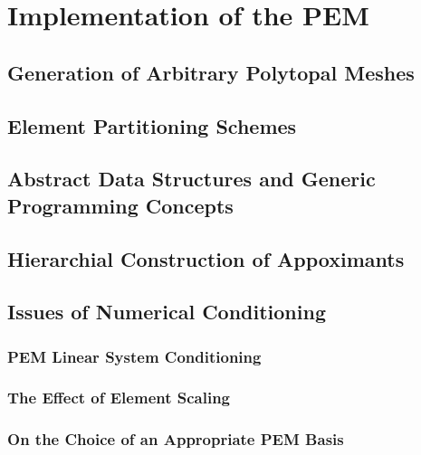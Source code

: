 \chapter{Implementation of the PEM}
%
\section{Generation of Arbitrary Polytopal Meshes}

\section{Element Partitioning Schemes}

\section{Abstract Data Structures and Generic Programming Concepts}

\section{Hierarchial Construction of Appoximants}

\section{Issues of Numerical Conditioning}
\subsection{PEM Linear System Conditioning}
\subsection{The Effect of Element Scaling}
\subsection{On the Choice of an Appropriate PEM Basis}
